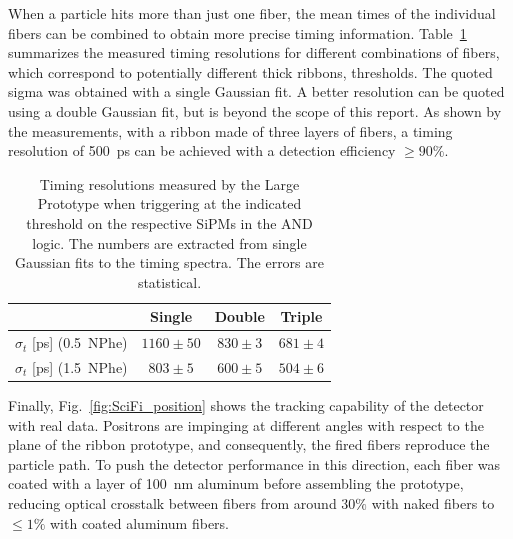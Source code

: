 \begin{refsection}
        When a particle hits more than just one fiber, the mean times of the individual fibers can be combined to obtain more precise timing information. Table~\ref{tab:TimingResRibbon} summarizes the measured timing resolutions for different combinations of fibers, which correspond to potentially different thick ribbons, thresholds. The quoted sigma was obtained with a single Gaussian fit. A better resolution can be quoted using a double Gaussian fit, but is beyond the scope of this report. As shown by the measurements, with a ribbon made of three layers of fibers, a timing resolution of \SI{500}{ps} can be achieved with a detection efficiency $\geq90\%$.
        
        \begin{table}
        	\centering
        		\begin{tabular}{l | c | c | c }
          			  & Single & Double & Triple \\ \hline\hline
        			  $\sigma_{t}$ [ps] \hspace{0.32cm} (0.5~NPhe) & $1160\pm50$ & $830\pm3$ & $681\pm4$ \\
        			 $\sigma_{t}$ [ps] \hspace{0.32cm} (1.5~NPhe) & $803\pm5$& $600\pm5$ & $504\pm6$  \\
        		\end{tabular}
             \caption[]{Timing resolutions measured by the Large Prototype when triggering at the indicated threshold on the respective SiPMs in the AND logic. The numbers are extracted from single Gaussian fits to the timing spectra. The errors are statistical. }
        	\label{tab:TimingResRibbon}
        \end{table}
        
        Finally, Fig.~\ref{fig:SciFi_position} shows the tracking capability of the detector with real data. Positrons are impinging at different angles with respect to the plane of the ribbon prototype, and consequently, the fired fibers reproduce the particle path. To push the detector performance in this direction, each fiber was coated with a layer of \SI{100}{nm} aluminum before assembling the prototype, reducing optical crosstalk between fibers from around $30\%$ with naked fibers to $\leq1\%$ with coated aluminum fibers.
        

\end{refsection}
